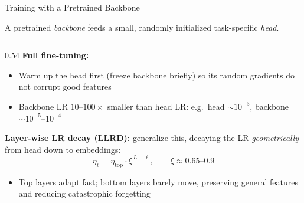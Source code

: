 \begin{frame}{Training with a Pretrained Backbone}

  A pretrained \emph{backbone} feeds a small, randomly initialized task-specific \emph{head}.

  \vspace{0.3em}
  \begin{columns}[T]
    \begin{column}{0.54\textwidth}
      \textbf{Full fine-tuning:}
      \begin{itemize}
        \item Warm up the head first (freeze backbone briefly) so its random gradients do not corrupt good features
        \item Backbone LR $10$--$100\times$ smaller than head LR: e.g.\ head $\sim 10^{-3}$, backbone $\sim 10^{-5}$--$10^{-4}$
      \end{itemize}

      \vspace{0.3em}
      \textbf{Layer-wise LR decay (LLRD):} generalize this, decaying the LR \emph{geometrically} from head down to embeddings:
      \[
        \eta_\ell = \eta_{\text{top}} \cdot \xi^{\,L - \ell}, \qquad \xi \approx 0.65\text{--}0.9
      \]
      \begin{itemize}
        \item Top layers adapt fast; bottom layers barely move, preserving general features and reducing catastrophic forgetting
      \end{itemize}


\end{column}
\end{columns}
\end{frame}
